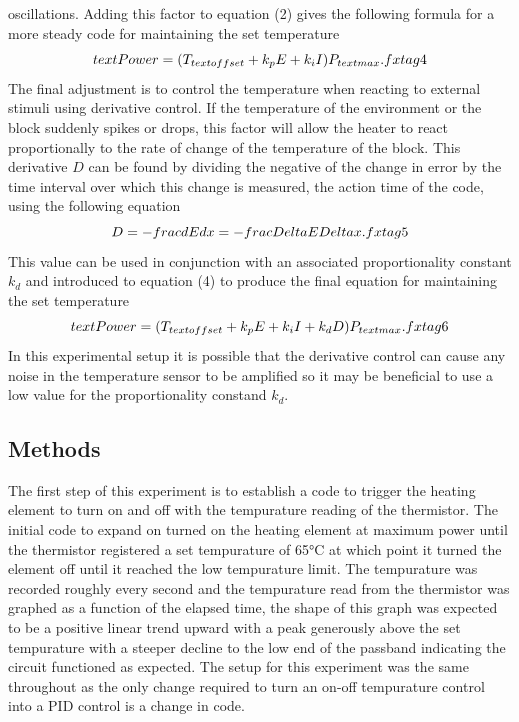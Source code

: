 \documentclass[11pt]{article}
\begin{document}
oscillations. Adding this factor to equation (2) gives the following
formula for a more steady code for maintaining the set temperature
\[\\text{Power} = ( T_{\\text{offset}} + k_p E + k_i I) P_{\\text{max}}. \\tag{4}\]
The final adjustment is to control the temperature when reacting to
external stimuli using derivative control. If the temperature of the
environment or the block suddenly spikes or drops, this factor will
allow the heater to react proportionally to the rate of change of the
temperature of the block. This derivative \(D\) can be found by dividing
the negative of the change in error by the time interval over which this
change is measured, the action time of the code, using the following
equation
\[D = - \\frac{dE}{dx} = - \\frac{\\Delta{E}}{\\Delta{x}}. \\tag{5}\]
This value can be used in conjunction with an associated proportionality
constant \(k_d\) and introduced to equation (4) to produce the final
equation for maintaining the set temperature
\[\\text{Power} = ( T_{\\text{offset}} + k_p E + k_i I + k_d D) P_{\\text{max}}. \\tag{6}\]
In this experimental setup it is possible that the derivative control
can cause any noise in the temperature sensor to be amplified so it may
be beneficial to use a low value for the proportionality constand
\(k_d\).

    \hypertarget{methods}{%
\subsection{Methods}\label{methods}}

    The first step of this experiment is to establish a code to trigger the
heating element to turn on and off with the tempurature reading of the
thermistor. The initial code to expand on turned on the heating element
at maximum power until the thermistor registered a set tempurature of
65°C at which point it turned the element off until it reached the low
tempurature limit. The tempurature was recorded roughly every second and
the tempurature read from the thermistor was graphed as a function of
the elapsed time, the shape of this graph was expected to be a positive
linear trend upward with a peak generously above the set tempurature
with a steeper decline to the low end of the passband indicating the
circuit functioned as expected. The setup for this experiment was the
same throughout as the only change required to turn an on-off
tempurature control into a PID control is a change in code.
\end{document}
